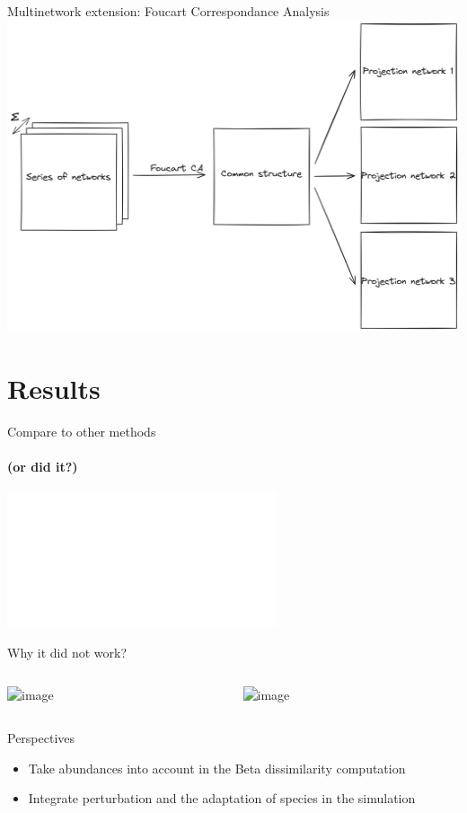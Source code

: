 \documentclass{beamer}
\begin{document}
\begin{frame}{Multinetwork extension: Foucart Correspondance Analysis}
\protect\hypertarget{foucart-ca}{}
\includegraphics[width=\linewidth]{figures_slides/foucart.png}%
\end{frame}

\section{Results}

\begin{frame}{Compare to other methods}
  \framesubtitle{(or did it?)}
  \includegraphics<1->[width=\linewidth]{figures_slides/rewiring.pdf}%
\end{frame}


\begin{frame}{Why it did not work?}
  \begin{columns}
    \begin{column}{.5\linewidth}
      \includegraphics<1->[width=\linewidth]{figures_slides/foucart_limits.png}%
    \end{column}
    \begin{column}{.5\linewidth}
      \includegraphics<2->[width=\linewidth]{figures_slides/simulation_limits.png}%
    \end{column}
  \end{columns}
\end{frame}

\begin{frame}{Perspectives}
\protect\hypertarget{perspectives}{}
\begin{itemize}
\item
  Take abundances into account in the Beta dissimilarity computation
\item
  Integrate perturbation and the adaptation of species in the simulation
\end{itemize}
\end{frame}
\end{document}
